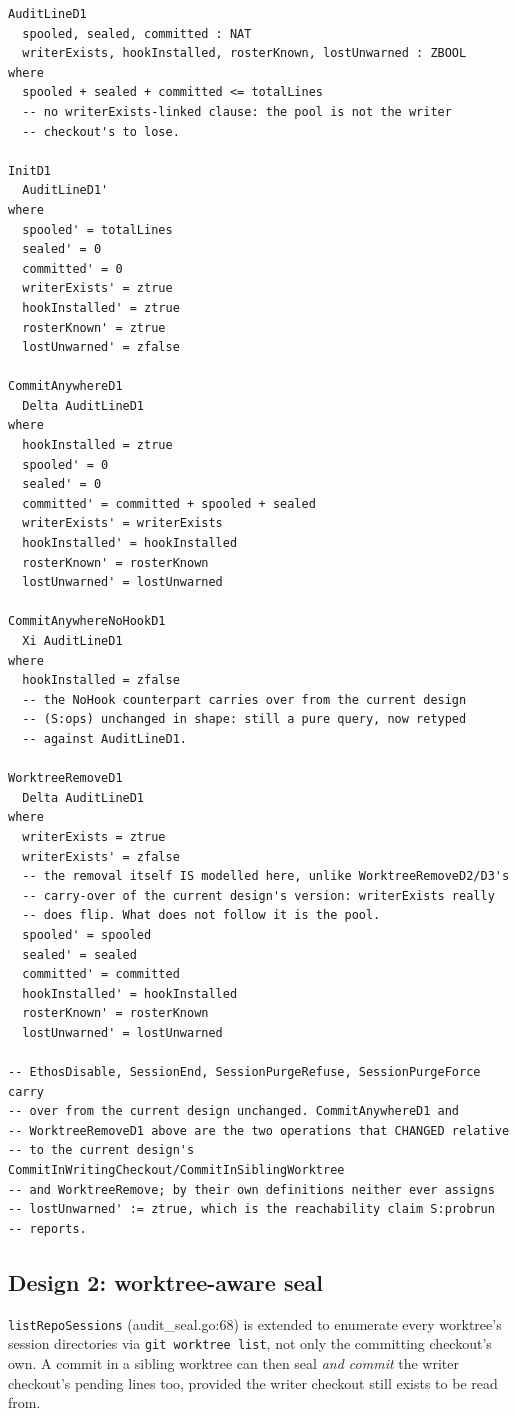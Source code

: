 \documentclass[a4paper,10pt,fleqn]{article}
\newcommand{\fpath}[1]{\nolinkurl{#1}}
\newcommand{\field}[1]{\ifmmode\texttt{#1}\else\texorpdfstring{\breakfield{#1}}{#1}\fi}
\begin{document}
\begin{verbatim}
AuditLineD1
  spooled, sealed, committed : NAT
  writerExists, hookInstalled, rosterKnown, lostUnwarned : ZBOOL
where
  spooled + sealed + committed <= totalLines
  -- no writerExists-linked clause: the pool is not the writer
  -- checkout's to lose.

InitD1
  AuditLineD1'
where
  spooled' = totalLines
  sealed' = 0
  committed' = 0
  writerExists' = ztrue
  hookInstalled' = ztrue
  rosterKnown' = ztrue
  lostUnwarned' = zfalse

CommitAnywhereD1
  Delta AuditLineD1
where
  hookInstalled = ztrue
  spooled' = 0
  sealed' = 0
  committed' = committed + spooled + sealed
  writerExists' = writerExists
  hookInstalled' = hookInstalled
  rosterKnown' = rosterKnown
  lostUnwarned' = lostUnwarned

CommitAnywhereNoHookD1
  Xi AuditLineD1
where
  hookInstalled = zfalse
  -- the NoHook counterpart carries over from the current design
  -- (S:ops) unchanged in shape: still a pure query, now retyped
  -- against AuditLineD1.

WorktreeRemoveD1
  Delta AuditLineD1
where
  writerExists = ztrue
  writerExists' = zfalse
  -- the removal itself IS modelled here, unlike WorktreeRemoveD2/D3's
  -- carry-over of the current design's version: writerExists really
  -- does flip. What does not follow it is the pool.
  spooled' = spooled
  sealed' = sealed
  committed' = committed
  hookInstalled' = hookInstalled
  rosterKnown' = rosterKnown
  lostUnwarned' = lostUnwarned

-- EthosDisable, SessionEnd, SessionPurgeRefuse, SessionPurgeForce carry
-- over from the current design unchanged. CommitAnywhereD1 and
-- WorktreeRemoveD1 above are the two operations that CHANGED relative
-- to the current design's CommitInWritingCheckout/CommitInSiblingWorktree
-- and WorktreeRemove; by their own definitions neither ever assigns
-- lostUnwarned' := ztrue, which is the reachability claim S:probrun
-- reports.
\end{verbatim}

\subsection{Design 2: worktree-aware seal}
\label{sec:design2}

\field{listRepoSessions} (audit\_seal.go:68) is extended to enumerate every
worktree's session directories via \fpath{git worktree list}, not only the
committing checkout's own. A commit in a sibling worktree can then seal
\emph{and commit} the writer checkout's pending lines too, provided the
writer checkout still exists to be read from.
\end{document}
